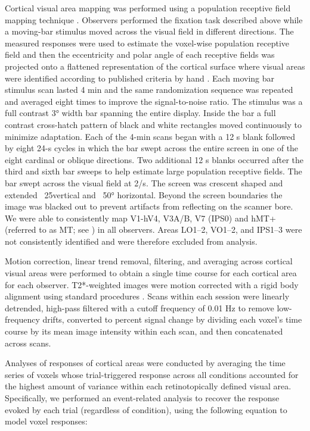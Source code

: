 \documentclass{report}
\begin{document}
Cortical visual area mapping was performed using a population receptive field mapping technique \citep{Dumoulin2008-uc}. Observers performed the fixation task described above while a moving-bar stimulus moved across the visual field in different directions. The measured responses were used to estimate the voxel-wise population receptive field and then the eccentricity and polar angle of each receptive fields was projected onto a flattened representation of the cortical surface where visual areas were identified according to published criteria by hand \citep{Gardner2008-yx,Wandell2007-pr}. Each moving bar stimulus scan lasted 4 min and the same randomization sequence was repeated and averaged eight times to improve the signal-to-noise ratio. The stimulus was a full contrast 3° width bar spanning the entire display. Inside the bar a full contrast cross-hatch pattern of black and white rectangles moved continuously to minimize adaptation. Each of the 4-min scans began with a 12 s blank followed by eight 24-s cycles in which the bar swept across the entire screen in one of the eight cardinal or oblique directions. Two additional 12 s blanks occurred after the third and sixth bar sweeps to help estimate large population receptive fields. The bar swept across the visual field at 2\degree /s. The screen was crescent shaped and extended ~25\degree vertical and ~50° horizontal. Beyond the screen boundaries the image was blacked out to prevent artifacts from reflecting on the scanner bore. We were able to consistently map V1-hV4, V3A/B, V7 (IPS0) and hMT+ (referred to as MT; see \citet{Huk2002-wq,Amano2009-ob}) in all observers. Areas LO1–2, VO1–2, and IPS1–3 were not consistently identified and were therefore excluded from analysis.

Motion correction, linear trend removal, filtering, and averaging across cortical visual areas were performed to obtain a single time course for each cortical area for each observer. T2*-weighted images were motion corrected with a rigid body alignment using standard procedures \citep{Nestares2000-by}. Scans within each session were linearly detrended, high-pass filtered with a cutoff frequency of 0.01 Hz to remove low-frequency drifts, converted to percent signal change by dividing each voxel’s time course by its mean image intensity within each scan, and then concatenated across scans.

Analyses of responses of cortical areas were conducted by averaging the time series of voxels whose trial-triggered response across all conditions accounted for the highest amount of variance within each retinotopically defined visual area. Specifically, we performed an event-related analysis to recover the response evoked by each trial (regardless of condition), using the following equation to model voxel responses:
\end{document}
